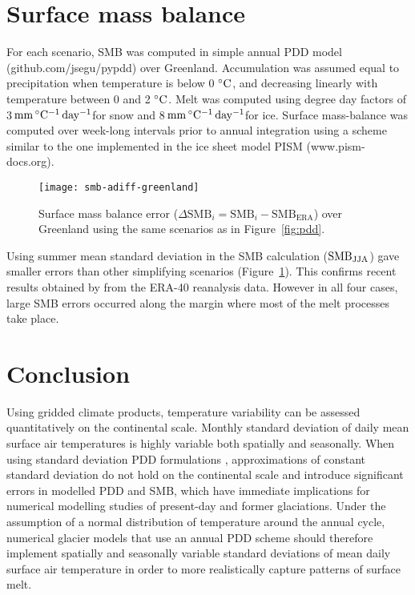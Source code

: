 \documentclass[review]{igs}
\newcommand{\degC}{\,\ensuremath{\rm^\circ C}}
\newcommand{\ddfunit}{\,\ensuremath{\rm mm\,^\circ C^{-1}\,day^{-1}}}
\begin{document}

\section{Surface mass balance}

For each scenario, SMB was computed in simple annual PDD model (github.com/jsegu/pypdd) over Greenland. Accumulation was assumed equal to precipitation when temperature is below 0\,\degC, and decreasing linearly with temperature between 0 and 2\,\degC. Melt was computed using degree day factors of 3\ddfunit for snow and 8\ddfunit for ice. Surface mass-balance was computed over week-long intervals prior to annual integration using a scheme similar to the one implemented in the ice sheet model PISM (www.pism-docs.org).

\begin{figure}
  \centering\texttt{[image: smb-adiff-greenland]}
  \caption{Surface mass balance error ($\Delta\mathrm{SMB}_i = \mathrm{SMB}_i - \mathrm{SMB_{ERA}}$) over Greenland using the same scenarios as in Figure~\ref{fig:pdd}.}
  \label{fig:smb}
\end{figure}

Using summer mean standard deviation in the SMB calculation ($\rm SMB_{JJA}$) gave smaller errors than other simplifying scenarios (Figure~\ref{fig:smb}). This confirms recent results obtained by \citet{rau-rogozhina-2013} from the ERA-40 reanalysis data. However in all four cases, large SMB errors occurred along the margin where most of the melt processes take place.


\section{Conclusion}

Using gridded climate products, temperature variability can be assessed quantitatively on the continental scale. Monthly standard deviation of daily mean surface air temperatures is highly variable both spatially and seasonally. When using standard deviation PDD formulations \citep{braithwaite-1984,reeh-1991,calov-greve-2005}, approximations of constant standard deviation do not hold on the continental scale and introduce significant errors in modelled PDD and SMB, which have immediate implications for numerical modelling studies of present-day and former glaciations. Under the assumption of a normal distribution of temperature around the annual cycle, numerical glacier models that use an annual PDD scheme should therefore implement spatially and seasonally variable standard deviations of mean daily surface air temperature in order to more realistically capture patterns of surface melt.
\end{document}

